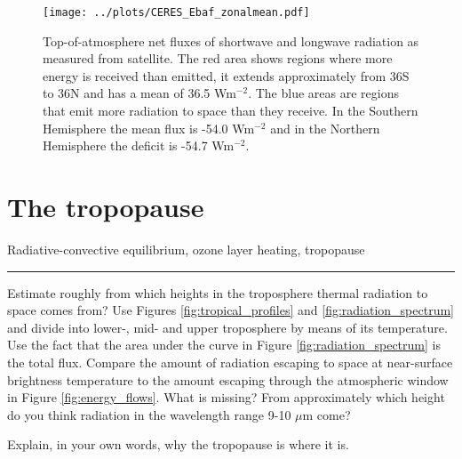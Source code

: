 \documentclass[12pt]{book}
\begin{document}
\begin{figure}
\begin{center}
\texttt{[image: ../plots/CERES\_Ebaf\_zonalmean.pdf]}
\end{center}
\caption{ Top-of-atmosphere net fluxes of shortwave and longwave radiation as measured from satellite. The red area shows regions where more energy is received than emitted, it extends approximately from 36S to 36N and has a mean of 36.5 Wm$^{-2}$. The blue areas are regions that emit more radiation to space than they receive. In the Southern Hemisphere the mean flux is -54.0 Wm$^{-2}$ and in the Northern Hemisphere the deficit is -54.7 Wm$^{-2}$.  } 
\label{fig:ceres_fluxes}
\end{figure}


\section{The tropopause}

Radiative-convective equilibrium, ozone layer heating, tropopause


\newpage
\vspace{1 cm}
\hrule
{\setlength{\parindent}{0cm}
\begin{exercise}
Estimate roughly from which heights in the troposphere thermal radiation to space comes from? Use Figures \ref{fig:tropical_profiles} and \ref{fig:radiation_spectrum} and divide into lower-, mid- and upper troposphere by means of its temperature. Use the fact that the area under the curve in Figure  \ref{fig:radiation_spectrum} is the total flux. Compare the amount of radiation escaping to space at near-surface brightness temperature to the amount escaping through the atmospheric window in Figure \ref{fig:energy_flows}. What is missing? From approximately which height do you think radiation in the wavelength range 9-10 $\mu$m come? 
\end{exercise}

\begin{exercise}
Explain, in your own words, why the tropopause is where it is.
\end{exercise}
}
\end{document}
